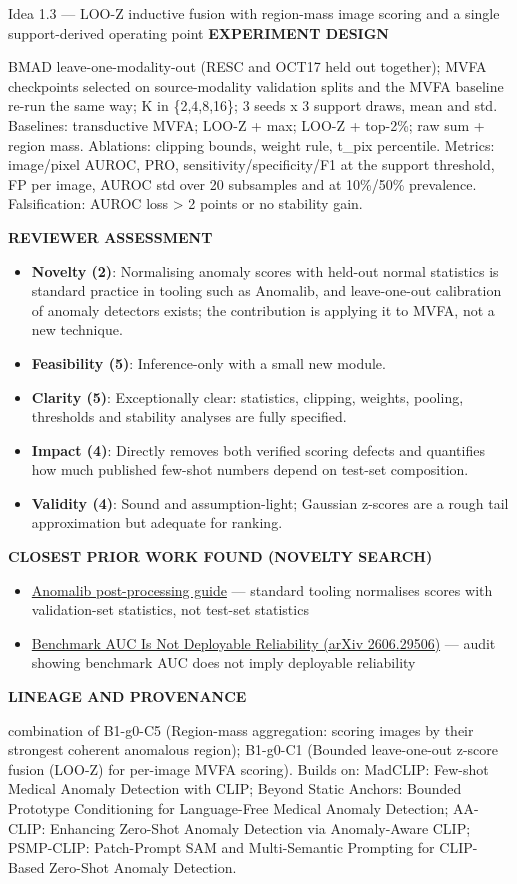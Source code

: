 \documentclass[11pt,a4paper]{article}
\newcommand{\lbl}[1]{{\sffamily\footnotesize\bfseries\color{muted}\MakeUppercase{#1}}\par}
\begin{document}
\begin{ideabox}{Idea 1.3 — LOO-Z inductive fusion with region-mass image scoring and a single support-derived operating point}
\lbl{Experiment design}BMAD leave-one-modality-out (RESC and OCT17 held out together); MVFA checkpoints selected on source-modality validation splits and the MVFA baseline re-run the same way; K in \{2,4,8,16\}; 3 seeds x 3 support draws, mean and std. Baselines: transductive MVFA; LOO-Z + max; LOO-Z + top-2\%; raw sum + region mass. Ablations: clipping bounds, weight rule, t\_\allowbreak{}pix percentile. Metrics: image/pixel AUROC, PRO, sensitivity/specificity/F1 at the support threshold, FP per image, AUROC std over 20 subsamples and at 10\%/50\% prevalence. Falsification: AUROC loss \textgreater{} 2 points or no stability gain.

\lbl{Reviewer assessment}\begin{itemize}[leftmargin=1.2em,itemsep=1pt,topsep=2pt]
\item \textbf{Novelty (2)}: Normalising anomaly scores with held-out normal statistics is standard practice in tooling such as Anomalib, and leave-one-out calibration of anomaly detectors exists; the contribution is applying it to MVFA, not a new technique.
\item \textbf{Feasibility (5)}: Inference-only with a small new module.
\item \textbf{Clarity (5)}: Exceptionally clear: statistics, clipping, weights, pooling, thresholds and stability analyses are fully specified.
\item \textbf{Impact (4)}: Directly removes both verified scoring defects and quantifies how much published few-shot numbers depend on test-set composition.
\item \textbf{Validity (4)}: Sound and assumption-light; Gaussian z-scores are a rough tail approximation but adequate for ranking.
\end{itemize}
\lbl{Closest prior work found (novelty search)}\begin{itemize}[leftmargin=1.2em,itemsep=1pt,topsep=2pt]
\item \href{https://anomalib.readthedocs.io/en/latest/markdown/guides/how_to/models/post_processor.html}{Anomalib post-processing guide} — standard tooling normalises scores with validation-set statistics, not test-set statistics
\item \href{https://arxiv.org/pdf/2606.29506}{Benchmark AUC Is Not Deployable Reliability (arXiv 2606.29506)} — audit showing benchmark AUC does not imply deployable reliability
\end{itemize}
\lbl{Lineage and provenance}{\small combination of B1-g0-C5 (Region-mass aggregation: scoring images by their strongest coherent anomalous region); B1-g0-C1 (Bounded leave-one-out z-score fusion (LOO-Z) for per-image MVFA scoring). Builds on: MadCLIP: Few-shot Medical Anomaly Detection with CLIP; Beyond Static Anchors: Bounded Prototype Conditioning for Language-Free Medical Anomaly Detection; AA-CLIP: Enhancing Zero-Shot Anomaly Detection via Anomaly-Aware CLIP; PSMP-CLIP: Patch-Prompt SAM and Multi-Semantic Prompting for CLIP-Based Zero-Shot Anomaly Detection.}
\end{ideabox}
\end{document}
